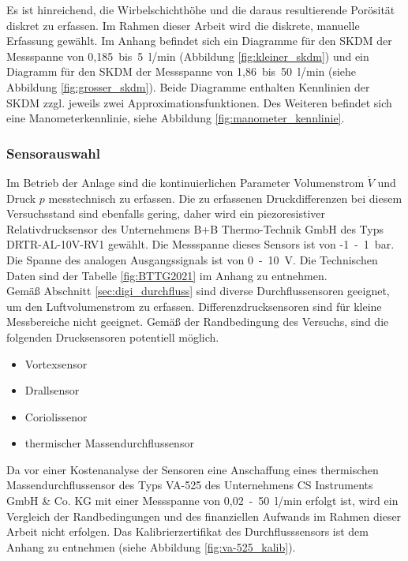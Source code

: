 \newpage




Es ist hinreichend, die Wirbelschichthöhe und die daraus resultierende Porösität diskret zu erfassen. Im Rahmen dieser Arbeit wird die diskrete, manuelle Erfassung gewählt. Im Anhang befindet sich ein Diagramme für den SKDM der Messspanne von 0,185~bis~5~l/min (Abbildung \ref{fig:kleiner_skdm}) und ein Diagramm für den SKDM der Messspanne von 1,86~bis~50~l/min (siehe Abbildung \ref{fig:grosser_skdm}). Beide Diagramme enthalten Kennlinien der SKDM zzgl. jeweils zwei Approximationsfunktionen. Des Weiteren befindet sich eine Manometerkennlinie, siehe Abbildung \ref{fig:manometer_kennlinie}.\\


\subsubsection{Sensorauswahl}

Im Betrieb der Anlage sind die kontinuierlichen Parameter Volumenstrom $\dot{V}$ und Druck $p$ messtechnisch zu erfassen. Die zu erfassenen Druckdifferenzen bei diesem Versuchsstand sind ebenfalls gering, daher wird ein piezoresistiver Relativdrucksensor des Unternehmens B+B Thermo-Technik GmbH des Typs DRTR-AL-10V-RV1 gewählt. Die Messspanne dieses Sensors ist von -1~-~1~bar. Die Spanne des analogen Ausgangssignals ist von 0~-~10~V. Die Technischen Daten sind der Tabelle \ref{fig:BTTG2021} im Anhang zu entnehmen. \\

Gemäß Abschnitt \ref{sec:digi_durchfluss} sind diverse Durchflussensoren geeignet, um den Luftvolumenstrom zu erfassen. Differenzdrucksensoren sind für kleine Messbereiche nicht geeignet. Gemäß der Randbedingung des Versuchs, sind die folgenden Drucksensoren potentiell möglich.

\begin{itemize}
\item Vortexsensor
\item Drallsensor
\item Coriolissenor
\item thermischer Massendurchflussensor
\end{itemize}  

Da vor einer Kostenanalyse der Sensoren eine Anschaffung eines thermischen Massendurchflussensor des Typs VA-525 des Unternehmens CS Instruments GmbH \& Co. KG mit einer Messspanne von 0,02~-~50~l/min erfolgt ist, wird ein Vergleich der Randbedingungen und des finanziellen Aufwands im Rahmen dieser Arbeit nicht erfolgen. Das Kalibrierzertifikat des Durchflusssensors ist dem Anhang zu entnehmen (siehe Abbildung \ref{fig:va-525_kalib}). \newpage


